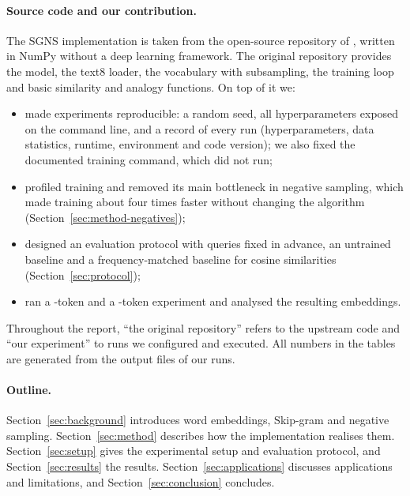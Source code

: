 \paragraph{Source code and our contribution.}
The SGNS implementation is taken from the open-source repository of \citet{caselli2026word2vec}, written in NumPy without a deep learning framework. The original repository provides the model, the text8 loader, the vocabulary with subsampling, the training loop and basic similarity and analogy functions. On top of it we:
\begin{itemize}
    \item made experiments reproducible: a random seed, all hyperparameters exposed on the command line, and a record of every run (hyperparameters, data statistics, runtime, environment and code version); we also fixed the documented training command, which did not run;
    \item profiled training and removed its main bottleneck in negative sampling, which made training about four times faster without changing the algorithm (Section~\ref{sec:method-negatives});
    \item designed an evaluation protocol with queries fixed in advance, an untrained baseline and a frequency-matched baseline for cosine similarities (Section~\ref{sec:protocol});
    \item ran a \DemoTokensShort-token and a \FinalTokensShort-token experiment and analysed the resulting embeddings.
\end{itemize}
Throughout the report, ``the original repository'' refers to the upstream code and ``our experiment'' to runs we configured and executed. All numbers in the tables are generated from the output files of our runs.

\paragraph{Outline.}
Section~\ref{sec:background} introduces word embeddings, Skip-gram and negative sampling. Section~\ref{sec:method} describes how the implementation realises them. Section~\ref{sec:setup} gives the experimental setup and evaluation protocol, and Section~\ref{sec:results} the results. Section~\ref{sec:applications} discusses applications and limitations, and Section~\ref{sec:conclusion} concludes.
